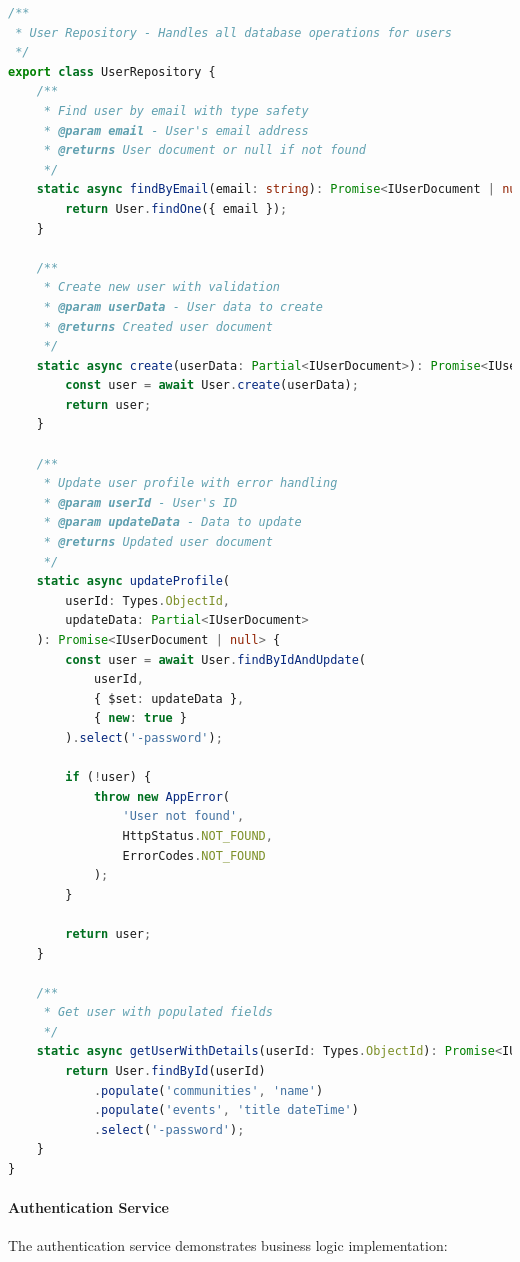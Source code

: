 \begin{lstlisting}[language=TypeScript, caption={User Repository Implementation}]
/**
 * User Repository - Handles all database operations for users
 */
export class UserRepository {
    /**
     * Find user by email with type safety
     * @param email - User's email address
     * @returns User document or null if not found
     */
    static async findByEmail(email: string): Promise<IUserDocument | null> {
        return User.findOne({ email });
    }

    /**
     * Create new user with validation
     * @param userData - User data to create
     * @returns Created user document
     */
    static async create(userData: Partial<IUserDocument>): Promise<IUserDocument> {
        const user = await User.create(userData);
        return user;
    }

    /**
     * Update user profile with error handling
     * @param userId - User's ID
     * @param updateData - Data to update
     * @returns Updated user document
     */
    static async updateProfile(
        userId: Types.ObjectId,
        updateData: Partial<IUserDocument>
    ): Promise<IUserDocument | null> {
        const user = await User.findByIdAndUpdate(
            userId,
            { $set: updateData },
            { new: true }
        ).select('-password');
        
        if (!user) {
            throw new AppError(
                'User not found',
                HttpStatus.NOT_FOUND,
                ErrorCodes.NOT_FOUND
            );
        }
        
        return user;
    }

    /**
     * Get user with populated fields
     */
    static async getUserWithDetails(userId: Types.ObjectId): Promise<IUserDocument | null> {
        return User.findById(userId)
            .populate('communities', 'name')
            .populate('events', 'title dateTime')
            .select('-password');
    }
}
\end{lstlisting}

\paragraph{Authentication Service}
The authentication service demonstrates business logic implementation:

